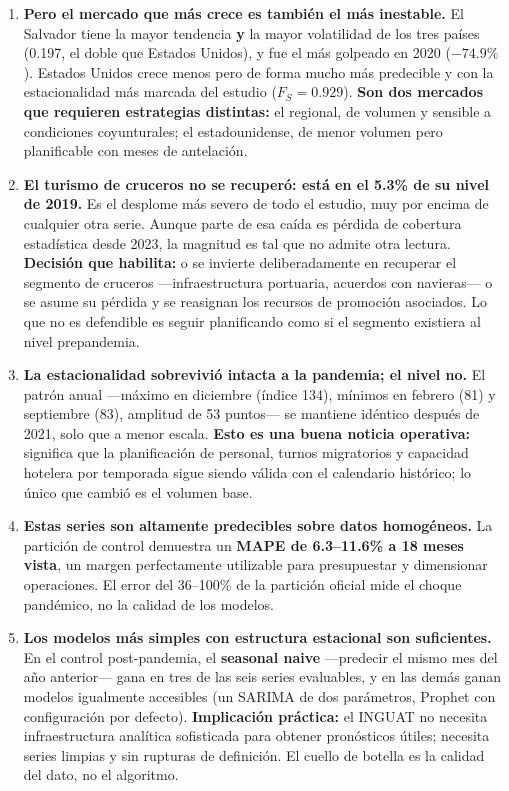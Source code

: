 \documentclass[12pt,letterpaper]{article}
\begin{document}
\begin{enumerate}[leftmargin=1.6em,itemsep=6pt]
\item \textbf{Pero el mercado que más crece es también el más inestable.} El Salvador tiene la
mayor tendencia \textbf{y} la mayor volatilidad de los tres países (0.197, el doble que Estados
Unidos), y fue el más golpeado en 2020 ($-74.9\%$). Estados Unidos crece menos pero de forma
mucho más predecible y con la estacionalidad más marcada del estudio ($F_S = 0.929$).
\textbf{Son dos mercados que requieren estrategias distintas:} el regional, de volumen y
sensible a condiciones coyunturales; el estadounidense, de menor volumen pero planificable con
meses de antelación.

\item \textbf{El turismo de cruceros no se recuperó: está en el 5.3\% de su nivel de 2019.} Es
el desplome más severo de todo el estudio, muy por encima de cualquier otra serie. Aunque parte
de esa caída es pérdida de cobertura estadística desde 2023, la magnitud es tal que no admite
otra lectura. \textbf{Decisión que habilita:} o se invierte deliberadamente en recuperar el
segmento de cruceros ---infraestructura portuaria, acuerdos con navieras--- o se asume su pérdida
y se reasignan los recursos de promoción asociados. Lo que no es defendible es seguir
planificando como si el segmento existiera al nivel prepandemia.

\item \textbf{La estacionalidad sobrevivió intacta a la pandemia; el nivel no.} El patrón anual
---máximo en diciembre (índice 134), mínimos en febrero (81) y septiembre (83), amplitud de 53
puntos--- se mantiene idéntico después de 2021, solo que a menor escala. \textbf{Esto es una
buena noticia operativa:} significa que la planificación de personal, turnos migratorios y
capacidad hotelera por temporada sigue siendo válida con el calendario histórico; lo único que
cambió es el volumen base.

\item \textbf{Estas series son altamente predecibles sobre datos homogéneos.} La partición de
control demuestra un \textbf{MAPE de 6.3--11.6\% a 18 meses vista}, un margen perfectamente
utilizable para presupuestar y dimensionar operaciones. El error del 36--100\% de la partición
oficial mide el choque pandémico, no la calidad de los modelos.

\item \textbf{Los modelos más simples con estructura estacional son suficientes.} En el control
post-pandemia, el \textbf{seasonal naive} ---predecir el mismo mes del año anterior--- gana en
tres de las seis series evaluables, y en las demás ganan modelos igualmente accesibles (un SARIMA
de dos parámetros, Prophet con configuración por defecto). \textbf{Implicación práctica:} el
INGUAT no necesita infraestructura analítica sofisticada para obtener pronósticos útiles;
necesita series limpias y sin rupturas de definición. El cuello de botella es la calidad del
dato, no el algoritmo.


\end{enumerate}
\end{document}
